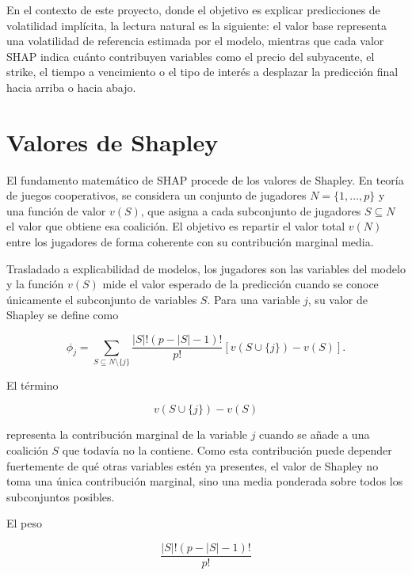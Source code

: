 En el contexto de este proyecto, donde el objetivo es explicar predicciones de volatilidad implícita, la lectura natural es la siguiente: el valor base representa una volatilidad de referencia estimada por el modelo, mientras que cada valor SHAP indica cuánto contribuyen variables como el precio del subyacente, el strike, el tiempo a vencimiento o el tipo de interés a desplazar la predicción final hacia arriba o hacia abajo.

\section{Valores de Shapley}

El fundamento matemático de SHAP procede de los valores de Shapley. En teoría de juegos cooperativos, se considera un conjunto de jugadores \(N = \{1,\ldots,p\}\) y una función de valor \(v(S)\), que asigna a cada subconjunto de jugadores \(S \subseteq N\) el valor que obtiene esa coalición. El objetivo es repartir el valor total \(v(N)\) entre los jugadores de forma coherente con su contribución marginal media.

Trasladado a explicabilidad de modelos, los jugadores son las variables del modelo y la función \(v(S)\) mide el valor esperado de la predicción cuando se conoce únicamente el subconjunto de variables \(S\). Para una variable \(j\), su valor de Shapley se define como

\begin{equation}
\phi_j =
\sum_{S \subseteq N \setminus \{j\}}
\frac{|S|!(p-|S|-1)!}{p!}
\left[
v(S \cup \{j\}) - v(S)
\right].
\label{eq:shapley}
\end{equation}

El término

\begin{equation}
v(S \cup \{j\}) - v(S)
\label{eq:shap-marginal-contribution}
\end{equation}

representa la contribución marginal de la variable \(j\) cuando se añade a una coalición \(S\) que todavía no la contiene. Como esta contribución puede depender fuertemente de qué otras variables estén ya presentes, el valor de Shapley no toma una única contribución marginal, sino una media ponderada sobre todos los subconjuntos posibles.

El peso

\begin{equation}
\frac{|S|!(p-|S|-1)!}{p!}
\label{eq:shapley-weight}
\end{equation}

